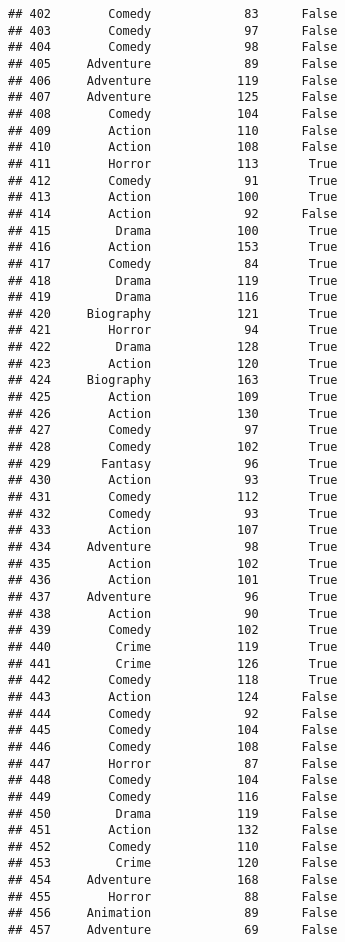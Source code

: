 \documentclass[
]{article}
\begin{document}
\begin{verbatim}
## 402        Comedy             83      False
## 403        Comedy             97      False
## 404        Comedy             98      False
## 405     Adventure             89      False
## 406     Adventure            119      False
## 407     Adventure            125      False
## 408        Comedy            104      False
## 409        Action            110      False
## 410        Action            108      False
## 411        Horror            113       True
## 412        Comedy             91       True
## 413        Action            100       True
## 414        Action             92      False
## 415         Drama            100       True
## 416        Action            153       True
## 417        Comedy             84       True
## 418         Drama            119       True
## 419         Drama            116       True
## 420     Biography            121       True
## 421        Horror             94       True
## 422         Drama            128       True
## 423        Action            120       True
## 424     Biography            163       True
## 425        Action            109       True
## 426        Action            130       True
## 427        Comedy             97       True
## 428        Comedy            102       True
## 429       Fantasy             96       True
## 430        Action             93       True
## 431        Comedy            112       True
## 432        Comedy             93       True
## 433        Action            107       True
## 434     Adventure             98       True
## 435        Action            102       True
## 436        Action            101       True
## 437     Adventure             96       True
## 438        Action             90       True
## 439        Comedy            102       True
## 440         Crime            119       True
## 441         Crime            126       True
## 442        Comedy            118       True
## 443        Action            124      False
## 444        Comedy             92      False
## 445        Comedy            104      False
## 446        Comedy            108      False
## 447        Horror             87      False
## 448        Comedy            104      False
## 449        Comedy            116      False
## 450         Drama            119      False
## 451        Action            132      False
## 452        Comedy            110      False
## 453         Crime            120      False
## 454     Adventure            168      False
## 455        Horror             88      False
## 456     Animation             89      False
## 457     Adventure             69      False

\end{verbatim}
\end{document}
